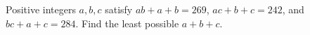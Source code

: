 Positive integers $a,b,c$ satisfy $ab+a+b=269$, $ac+b+c=242$, and $bc+a+c=284$. Find the least possible $a+b+c$.
